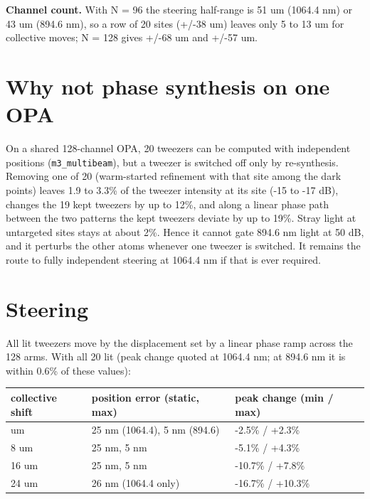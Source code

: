 \textbf{Channel count.} With N = 96 the steering half-range is 51 um
(1064.4 nm) or 43 um (894.6 nm), so a row of 20 sites (+/-38 um) leaves
only 5 to 13 um for collective moves; N = 128 gives +/-68 um and +/-57
um.

\hypertarget{4-why-not-phase-synthesis-on-one-opa}{%
\section{Why not phase synthesis on one
OPA}\label{twenty_tweezers-4-why-not-phase-synthesis-on-one-opa}}

On a shared 128-channel OPA, 20 tweezers can be computed with
independent positions (\texttt{m3\_multibeam}), but a tweezer is
switched off only by re-synthesis. Removing one of 20 (warm-started
refinement with that site among the dark points) leaves 1.9 to 3.3\% of
the tweezer intensity at its site (-15 to -17 dB), changes the 19 kept
tweezers by up to 12\%, and along a linear phase path between the two
patterns the kept tweezers deviate by up to 19\%. Stray light at
untargeted sites stays at about 2\%. Hence it cannot gate 894.6 nm light
at 50 dB, and it perturbs the other atoms whenever one tweezer is
switched. It remains the route to fully independent steering at 1064.4
nm if that is ever required.

\hypertarget{5-steering}{%
\section{Steering}\label{twenty_tweezers-5-steering}}

All lit tweezers move by the displacement set by a linear phase ramp
across the 128 arms. With all 20 lit (peak change quoted at 1064.4 nm;
at 894.6 nm it is within 0.6\% of these values):

{\small
\begin{longtable}[]{@{}lll@{}}
\toprule\noalign{}
collective shift & position error (static, max) & peak change (min /
max) \\
\midrule\noalign{}
\endhead
\bottomrule\noalign{}
\endlastfoot
4 um & 25 nm (1064.4), 5 nm (894.6) & -2.5\% / +2.3\% \\
8 um & 25 nm, 5 nm & -5.1\% / +4.3\% \\
16 um & 25 nm, 5 nm & -10.7\% / +7.8\% \\
24 um & 26 nm (1064.4 only) & -16.7\% / +10.3\% \\
\end{longtable}
}

